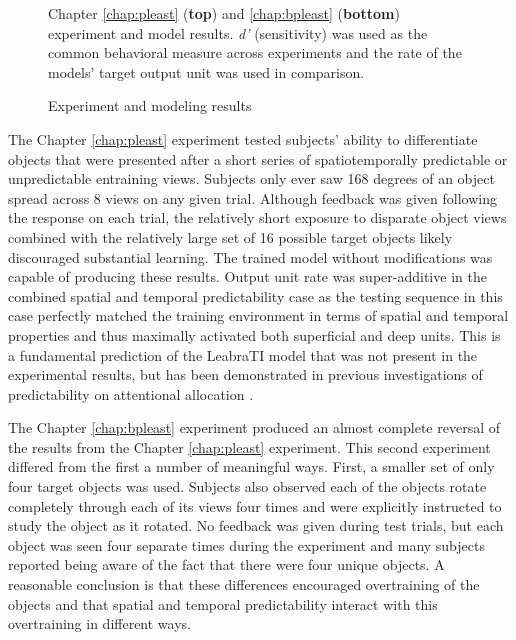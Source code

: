 \documentclass[dwyatte_dissertation.tex]{subfiles}
\begin{document}
\begin{figure}[h!]
\begin{center}
\begin{tabular}{ll}
\end{tabular}
\end{center}
\caption{Experiment and modeling results}{Chapter \ref{chap:pleast} (\textbf{top}) and \ref{chap:bpleast} (\textbf{bottom}) experiment and model results. \textit{d'} (sensitivity) was used as the common behavioral measure across experiments and the rate of the models' target output unit was used in comparison.}
\label{fig:sims_test}
\end{figure}

The Chapter \ref{chap:pleast} experiment tested subjects' ability to differentiate objects that were presented after a short series of spatiotemporally predictable or unpredictable entraining views. Subjects only ever saw 168 degrees of an object spread across 8 views on any given trial. Although feedback was given following the response on each trial, the relatively short exposure to disparate object views combined with the relatively large set of 16 possible target objects likely discouraged substantial learning. The trained model without modifications was capable of producing these results. Output unit rate was super-additive in the combined spatial and temporal predictability case as the testing sequence in this case perfectly matched the training environment in terms of spatial and temporal properties and thus maximally activated both superficial and deep units. This is a fundamental prediction of the LeabraTI model that was not present in the experimental results, but has been demonstrated in previous investigations of predictability on attentional allocation \cite{DohertyRaoMesulamEtAl05,RohenkohlGouldPessoaEtAl14}.

The Chapter \ref{chap:bpleast} experiment produced an almost complete reversal of the results from the Chapter \ref{chap:pleast} experiment. This second experiment differed from the first a number of meaningful ways. First, a smaller set of only four target objects was used. Subjects also observed each of the objects rotate completely through each of its views four times and were explicitly instructed to study the object as it rotated. No feedback was given during test trials, but each object was seen four separate times during the experiment and many subjects reported being aware of the fact that there were four unique objects. A reasonable conclusion is that these differences encouraged overtraining 
of the objects and that spatial and temporal predictability interact with this overtraining in different ways.
\end{document}
